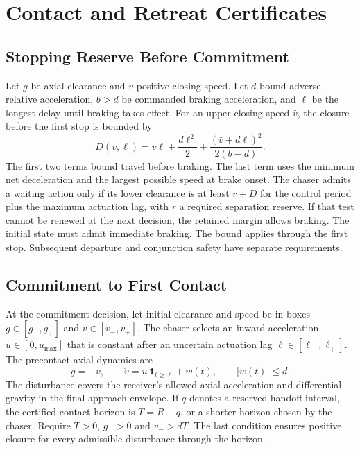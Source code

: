\documentclass{IEEEtaes}
\begin{document}
\section{Contact and Retreat Certificates}
\label{sec:guidance}

\subsection{Stopping Reserve Before Commitment}

Let $g$ be axial clearance and $v$ positive closing speed. Let $d$ bound adverse relative acceleration, $b>d$ be commanded braking acceleration, and $\ell$ be the longest delay until braking takes effect. For an upper closing speed $\bar v$, the closure before the first stop is bounded by
\begin{equation}
D(\bar v,\ell)=
  \bar v\ell+\frac{d\ell^2}{2}
  +\frac{(\bar v+d\ell)^2}{2(b-d)}.
\label{eq:stop}
\end{equation}
The first two terms bound travel before braking. The last term uses the minimum net deceleration and the largest possible speed at brake onset. The chaser admits a waiting action only if its lower clearance is at least $r+D$ for the control period plus the maximum actuation lag, with $r$ a required separation reserve. If that test cannot be renewed at the next decision, the retained margin allows braking. The initial state must admit immediate braking. The bound applies through the first stop. Subsequent departure and conjunction safety have separate requirements.

\subsection{Commitment to First Contact}

At the commitment decision, let initial clearance and speed be in boxes $g\in[g_-,g_+]$ and $v\in[v_-,v_+]$. The chaser selects an inward acceleration $u\in[0,u_{\max}]$ that is constant after an uncertain actuation lag $\ell\in[\ell_-,\ell_+]$. The precontact axial dynamics are
\begin{equation}
\dot g=-v,\qquad
\dot v=u\,\mathbf{1}_{t\geq \ell}+w(t),\qquad
|w(t)|\leq d.
\label{eq:model}
\end{equation}
The disturbance covers the receiver's allowed axial acceleration and differential gravity in the final-approach envelope. If $q$ denotes a reserved handoff interval, the certified contact horizon is $T=R-q$, or a shorter horizon chosen by the chaser. Require $T>0$, $g_->0$ and $v_->dT$. The last condition ensures positive closure for every admissible disturbance through the horizon.
\end{document}
